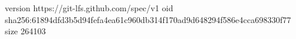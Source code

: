 version https://git-lfs.github.com/spec/v1
oid sha256:61894dfd3b5d94fefa4ea61c960db314f170ad9d648294f586e4cca698330f77
size 264103
